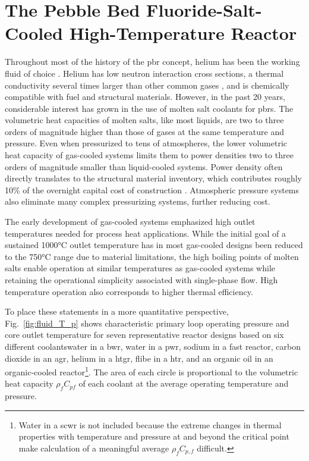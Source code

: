 \chapter[The Pebble Bed Fluoride-Salt-Cooled High-Temperature Reactor]{The Pebble Bed Fluoride-Salt-Cooled High-Temperature Reactor}
\label{sec:pbfhr}

Throughout most of the history of the \gls{pbr} concept, helium has been the working fluid of choice \cite{claxton,hecker,oehme,nrc_avr,moormann,thtr_1990,hofmann,thomas,koster,gao,chen_htr,xu_htr,htrpm}. Helium has low neutron interaction cross sections, a thermal conductivity several times larger than other common gases \cite{gases_k}, and is chemically compatible with fuel and structural materials. However, in the past 20 years, considerable interest has grown in the use of molten salt coolants for \glspl{pbr}. The volumetric heat capacities of molten salts, like most liquids, are two to three orders of magnitude higher than those of gases at the same temperature and pressure. Even when pressurized to tens of atmospheres, the lower volumetric heat capacity of gas-cooled systems limits them to power densities two to three orders of magnitude smaller than liquid-cooled systems. Power density often directly translates to the structural material inventory, which contributes roughly 10\% of the overnight capital cost of construction \cite{xin_wang_thesis}. Atmospheric pressure systems also eliminate many complex pressurizing systems, further reducing cost.

The early development of gas-cooled systems emphasized high outlet temperatures needed for process heat applications. While the initial goal of a sustained 1000\si{\celsius} outlet temperature has in most gas-cooled designs been reduced to the 750\si{\celsius} range due to material limitations, the high boiling points of molten salts enable operation at similar temperatures as gas-cooled systems while retaining the operational simplicity associated with single-phase flow. High temperature operation also corresponds to higher thermal efficiency. 

To place these statements in a more quantitative perspective, Fig.\ \ref{fig:fluid_T_p} shows characteristic primary loop operating pressure and core outlet temperature for seven representative reactor designs based on six different coolants\mdash water in a \gls{bwr}, water in a \gls{pwr}, sodium in a fast reactor, carbon dioxide in an \gls{agr}, helium in a \gls{htgr}, \gls{flibe} in a \gls{htr}, and an organic oil in an organic-cooled reactor\hspace{0.02cm}\footnote{Water in a \gls{scwr} is not included because the extreme changes in thermal properties with temperature and pressure at and beyond the critical point make calculation of a meaningful average \(\rho_fC_{p,f}\) difficult.}. The area of each circle is proportional to the volumetric heat capacity \(\rho_fC_{pf}\) of each coolant at the average operating temperature and pressure. 

